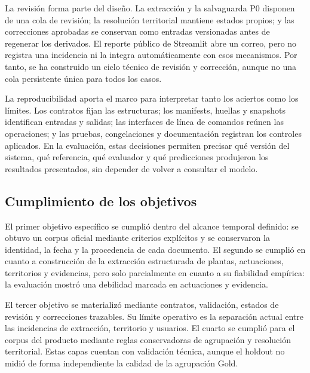 La revisión forma parte del diseño. La extracción y la salvaguarda P0 disponen
de una cola de revisión; la resolución territorial mantiene estados propios;
y las correcciones aprobadas se conservan como entradas versionadas antes de
regenerar los derivados. El reporte público de Streamlit abre un correo, pero
no registra una incidencia ni la integra automáticamente con esos mecanismos.
Por tanto, se ha construido un ciclo técnico de revisión y corrección, aunque
no una cola persistente única para todos los casos.

La reproducibilidad aporta el marco para interpretar tanto los aciertos como
los límites. Los contratos fijan las estructuras; los manifests, huellas y
snapshots identifican entradas y salidas; las interfaces de línea de comandos
reúnen las operaciones; y las pruebas, congelaciones y documentación registran
los controles aplicados. En la evaluación, estas decisiones permiten precisar
qué versión del sistema, qué referencia, qué evaluador y qué predicciones
produjeron los resultados presentados, sin depender de volver a consultar el
modelo.

\subsection{Cumplimiento de los objetivos}

El primer objetivo específico se cumplió dentro del alcance temporal definido:
se obtuvo un corpus oficial mediante criterios explícitos y se conservaron la
identidad, la fecha y la procedencia de cada documento. El segundo se cumplió
en cuanto a construcción de la extracción estructurada de plantas,
actuaciones, territorios y evidencias, pero solo parcialmente en cuanto a su
fiabilidad empírica: la evaluación mostró una debilidad marcada en actuaciones
y evidencia.

El tercer objetivo se materializó mediante contratos, validación, estados de
revisión y correcciones trazables. Su límite operativo es la separación actual
entre las incidencias de extracción, territorio y usuarios. El cuarto se
cumplió para el corpus del producto mediante reglas conservadoras de agrupación
y resolución territorial. Estas capas cuentan con validación técnica, aunque
el holdout no midió de forma independiente la calidad de la agrupación Gold.

